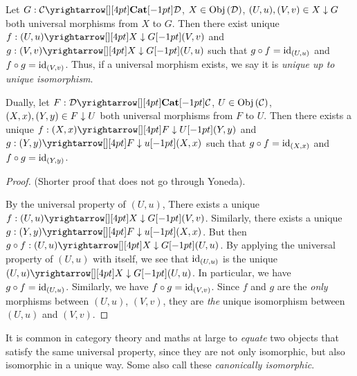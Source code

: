 \begin{prop}\hypertarget{uniprop}{}
  
  Let $G : \map{\CC}{\DD}{\CAT}{}$, $X \in \mathrm{Obj}\left(\mathcal{D}\right)$, 
  $(U,u), (V,v) \in X\downarrow G$ both universal morphisms from $X$ to $G$. 
  Then there exist unique $f : \map{(U,u)}{(V,v)}{X\darrow G}{}$
  and $g : \map{(V,v)}{(U,u)}{X\darrow G}{}$ such that 
  $g \circ f = \mathrm{id}_{(U,u)}$ and $f \circ g = \mathrm{id}_{(V,v)}$.
  Thus, if a universal morphism exists, 
  we say it is \emph{unique up to unique isomorphism}.

  Dually, let $F : \map{\DD}{\CC}{\CAT}{}$, $U \in \mathrm{Obj}\left(\mathcal{C}\right)$,
  $(X,x), (Y,y) \in F\downarrow U$ both universal morphisms from $F$ to $U$.
  Then there exists a unique $f : \map{(X,x)}{(Y,y)}{F\darrow U}{}$
  and $g : \map{(Y,y)}{(X,x)}{F\darrow u}{}$ such that 
  $g \circ f = \mathrm{id}_{(X,x)}$ and $f \circ g = \mathrm{id}_{(Y,y)}$.
\end{prop}
\begin{proof}(Shorter proof that does not go through Yoneda).

  By the universal property of $(U,u)$,
  There exists a unique $f : \map{(U,u)}{(V,v)}{X\darrow G}{}$.
  Similarly, there exists a unique $g : \map{(Y,y)}{(X,x)}{F\darrow u}{}$.
  But then $g \circ f : \map{(U,u)}{(U,u)}{X\darrow G}{}$.
  By applying the universal property of $(U,u)$ with itself,
  we see that $\mathrm{id}_{(U,u)}$ is the unique $\map{(U,u)}{(U,u)}{X\darrow G}{}$.
  In particular, we have $g \circ f = \mathrm{id}_{(U,u)}$.
  Similarly, we have $f \circ g = \mathrm{id}_{(V,v)}$.
  Since $f$ and $g$ are the \emph{only} morphisms between $(U,u)$, $(V,v)$,
  they are \emph{the} unique isomorphism between $(U,u)$ and $(V,v)$.
\end{proof}

\begin{rmk}
  \hypertarget{canonical}{}

  It is common in category theory and maths at large to \emph{equate} 
  two objects that satisfy the same universal property, 
  since they are not only isomorphic, but also isomorphic in a unique way. 
  Some also call these \emph{canonically isomorphic}.
\end{rmk}

